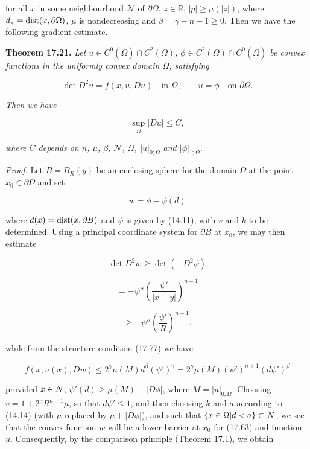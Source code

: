 for all $x$ in some neighbourhood $\mathcal N$ of $\partial\Omega$, $z \in \mathbb R$, $|p| \ge \mu(|z|)$, where $d_x = \operatorname{dist}(x,\partial\Omega)$,
$\mu$ is nondecreasing and $\beta = \gamma - n - 1 \ge 0$. Then we have the following gradient
estimate.

\textbf{Theorem 17.21.} \emph{Let $u \in C^0(\bar\Omega) \cap C^2(\Omega)$, $\phi \in C^2(\Omega) \cap C^0(\bar\Omega)$ be convex functions
in the uniformly convex domain $\Omega$, satisfying}

\begin{equation}
\tag{17.78}
\det D^2u = f(x,u,Du) \quad \text{in } \Omega, \qquad u = \phi \quad \text{on } \partial\Omega.
\end{equation}

\emph{Then we have}

\begin{equation}
\tag{17.79}
\sup_{\Omega} |Du| \le C,
\end{equation}

\emph{where $C$ depends on $n$, $\mu$, $\beta$, $\mathcal N$, $\Omega$, $|u|_{0;\Omega}$ and $|\phi|_{1;\Omega}$.}

\emph{Proof.} Let $B = B_R(y)$ be an enclosing sphere for the domain $\Omega$ at the point $x_0 \in \partial\Omega$
and set

\[
w = \phi - \psi(d)
\]

where $d(x) = \operatorname{dist}(x,\partial B)$ and $\psi$ is given by (14.11), with $v$ and $k$ to be determined.
Using a principal coordinate system for $\partial B$ at $x_0$, we may then estimate

\[
\det D^2w \ge \det(-D^2\psi)
\]

\[
= -\psi''\left(\frac{\psi'}{|x-y|}\right)^{n-1}
\]

\[
\ge -\psi''\left(\frac{\psi'}{R}\right)^{n-1}.
\]



while from the structure condition (17.77) we have

\[
f(x,u(x),Dw) \le 2^\gamma \mu(M)d^\beta(\psi')^\gamma
= 2^\gamma \mu(M)(\psi')^{n+1}(d\psi')^\beta
\]

provided $x \in N$, $\psi'(d) \ge \mu(M)+|D\phi|$, where $M = |u|_{0;\Omega}$. Choosing $v =
1 + 2^\gamma R^{n-1}\mu$, so that $d\psi' \le 1$, and then choosing $k$ and $a$ according to (14.14) (with
$\mu$ replaced by $\mu + |D\phi|$), and such that $\{x \in \Omega| d < a\} \subset N$, we see that the convex
function $w$ will be a lower barrier at $x_0$ for (17.63) and function $u$. Consequently, by
the comparison principle (Theorem 17.1), we obtain

